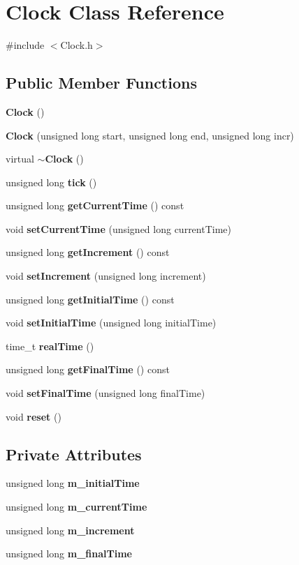 \section{Clock Class Reference}
\label{class_clock}


{\ttfamily \#include $<$Clock.\+h$>$}

\subsection*{Public Member Functions}
\begin{DoxyCompactItemize}
\item 
\textbf{ Clock} ()
\item 
\textbf{ Clock} (unsigned long start, unsigned long end, unsigned long incr)
\item 
virtual \textbf{ $\sim$\+Clock} ()
\item 
unsigned long \textbf{ tick} ()
\item 
unsigned long \textbf{ get\+Current\+Time} () const
\item 
void \textbf{ set\+Current\+Time} (unsigned long current\+Time)
\item 
unsigned long \textbf{ get\+Increment} () const
\item 
void \textbf{ set\+Increment} (unsigned long increment)
\item 
unsigned long \textbf{ get\+Initial\+Time} () const
\item 
void \textbf{ set\+Initial\+Time} (unsigned long initial\+Time)
\item 
time\+\_\+t \textbf{ real\+Time} ()
\item 
unsigned long \textbf{ get\+Final\+Time} () const
\item 
void \textbf{ set\+Final\+Time} (unsigned long final\+Time)
\item 
void \textbf{ reset} ()
\end{DoxyCompactItemize}
\subsection*{Private Attributes}
\begin{DoxyCompactItemize}
\item 
unsigned long \textbf{ m\+\_\+initial\+Time}
\item 
unsigned long \textbf{ m\+\_\+current\+Time}
\item 
unsigned long \textbf{ m\+\_\+increment}
\item 
unsigned long \textbf{ m\+\_\+final\+Time}
\end{DoxyCompactItemize}


